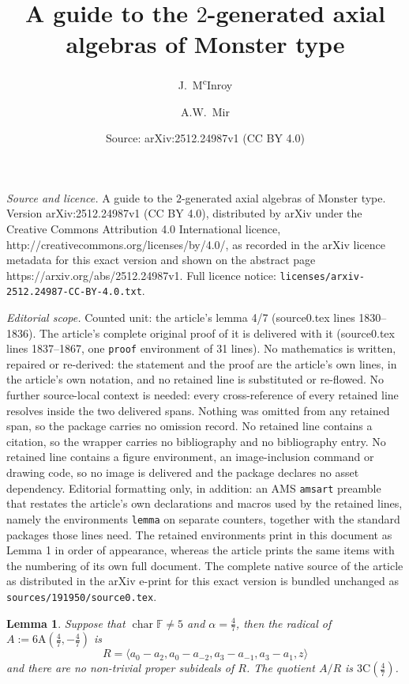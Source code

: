 \documentclass[10pt,a4paper]{amsart}
\title{A guide to the $2$-generated axial algebras of Monster type}
\author{J.~M\textsuperscript{c}Inroy \and A.W.~Mir}
\date{Source: arXiv:2512.24987v1 (CC BY 4.0)}
\newtheorem{lemma}{Lemma}
\newcommand{\A}{\mathrm{A}}
\newcommand{\C}{\mathrm{C}}
\newcommand\FF{\mathbb{F}}
\newcommand\al{\alpha}
\DeclareMathOperator{\ch}{char}
\newcommand\la{\langle}
\newcommand\ra{\rangle}
\begin{document}
\maketitle

\noindent\emph{Source and licence.} A guide to the $2$-generated axial algebras of Monster type. Version arXiv:2512.24987v1 (CC BY 4.0), distributed by arXiv under the Creative Commons Attribution 4.0 International licence, http://creativecommons.org/licenses/by/4.0/, as recorded in the arXiv licence metadata for this exact version and shown on the abstract page https://arxiv.org/abs/2512.24987v1. Full licence notice: \texttt{licenses/arxiv-2512.24987-CC-BY-4.0.txt}.\par\smallskip

\noindent\textit{Editorial scope.} Counted unit: the article's lemma 4/7 (source0.tex lines 1830--1836). The article's complete original proof of it is delivered with it (source0.tex lines 1837--1867, one \texttt{proof} environment of 31 lines). No mathematics is written, repaired or re-derived: the statement and the proof are the article's own lines, in the article's own notation, and no retained line is substituted or re-flowed.  No further source-local context is needed: every cross-reference of every retained line resolves inside the two delivered spans.  Nothing was omitted from any retained span, so the package carries no omission record.  No retained line contains a citation, so the wrapper carries no bibliography and no bibliography entry.  No retained line contains a figure environment, an image-inclusion command or drawing code, so no image is delivered and the package declares no asset dependency.  Editorial formatting only, in addition: an AMS \texttt{amsart} preamble that restates the article's own declarations and macros used by the retained lines, namely the environments \texttt{lemma} on separate counters, together with the standard packages those lines need.  The retained environments print in this document as Lemma 1 in order of appearance, whereas the article prints the same items with the numbering of its own full document.  The complete native source of the article as distributed in the arXiv e-print for this exact version is bundled unchanged as \texttt{sources/191950/source0.tex}.
\begin{lemma}\label{6Aideal 4/7}
Suppose that $\ch \FF \neq 5$ and $\al = \frac{4}{7}$, then the radical of $A := 6\A(\frac{4}{7}, -\frac{4}{7})$ is
\[
R = \la a_0 - a_2, a_0 - a_{-2}, a_3 - a_{-1}, a_3 - a_1, z \ra
\]
and there are no non-trivial proper subideals of $R$.  The quotient $A/R$ is $3\C(\frac{4}{7})$.
\end{lemma}
\end{document}
